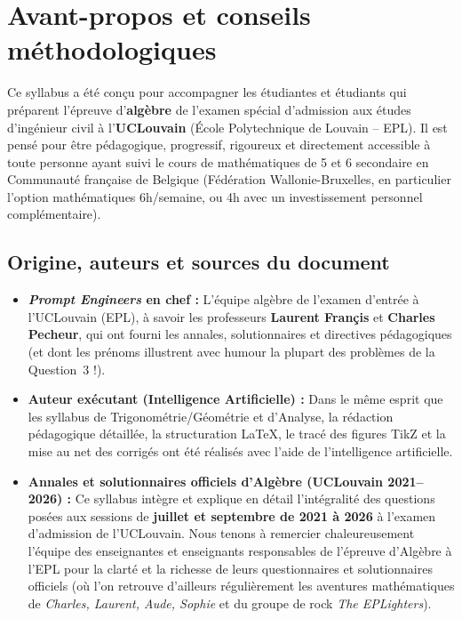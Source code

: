 \documentclass[11pt,a4paper,oneside]{book}
\begin{document}
\chapter*{Avant-propos et conseils méthodologiques}

Ce syllabus a été conçu pour accompagner les étudiantes et étudiants qui préparent l'épreuve d'\textbf{algèbre} de l'examen spécial d'admission aux études d'ingénieur civil à l'\textbf{UCLouvain} (École Polytechnique de Louvain -- EPL). Il est pensé pour être pédagogique, progressif, rigoureux et directement accessible à toute personne ayant suivi le cours de mathématiques de 5\ieme{} et 6\ieme{} secondaire en Communauté française de Belgique (Fédération Wallonie-Bruxelles, en particulier l'option mathématiques 6h/semaine, ou 4h avec un investissement personnel complémentaire).

\section*{Origine, auteurs et sources du document}

\begin{theoreme}
\begin{itemize}
    \item \textbf{\emph{Prompt Engineers} en chef :} L'équipe algèbre de l'examen d'entrée à l'UCLouvain (EPL), à savoir les professeurs \textbf{Laurent Fran\c{c}is} et \textbf{Charles Pecheur}, qui ont fourni les annales, solutionnaires et directives pédagogiques (et dont les prénoms illustrent avec humour la plupart des problèmes de la Question~3 !).
    \item \textbf{Auteur exécutant (Intelligence Artificielle) :} Dans le même esprit que les syllabus de Trigonométrie/Géométrie et d'Analyse, la rédaction pédagogique détaillée, la structuration \LaTeX{}, le tracé des figures TikZ et la mise au net des corrigés ont été réalisés avec l'aide de l'intelligence artificielle.
    \item \textbf{Annales et solutionnaires officiels d'Algèbre (UCLouvain 2021--2026) :} Ce syllabus intègre et explique en détail l'intégralité des questions posées aux sessions de \textbf{juillet et septembre de 2021 à 2026} à l'examen d'admission de l'UCLouvain. Nous tenons à remercier chaleureusement l'équipe des enseignantes et enseignants responsables de l'épreuve d'Algèbre à l'EPL pour la clarté et la richesse de leurs questionnaires et solutionnaires officiels (où l'on retrouve d'ailleurs régulièrement les aventures mathématiques de \emph{Charles, Laurent, Aude, Sophie} et du groupe de rock \emph{The EPLighters}).
\end{itemize}
\end{theoreme}
\end{document}
